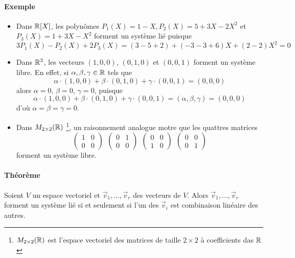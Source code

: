 \paragraph{Exemple}\begin{itemize}
	\item Dans $\mathbb{R}[X]$, les polynômes $P_1(X) = 1 - X, P_2(X) = 5 + 3 X - 2 X^2$ et $ P_3(X) = 1 + 3 X - X^2$ forment un système lié puisque 
	  $$3 P_1(X) - P_2(X) + 2 P_3(X) = (3 - 5 + 2) + (-3 - 3 + 6) X + (2 - 2) X^2 =0$$
	  
	\item Dans $\mathbb{R}^3$, les vecteurs $(1,0,0)$, $(0,1,0)$ et $(0,0,1)$ forment un système libre. En effet, si $\alpha, \beta, \gamma \in \mathbb{R}$ tels que 
	  $$\alpha \cdot (1,0,0)+ \beta \cdot (0,1,0)+ \gamma \cdot (0,0,1) = (0,0,0)$$ 
	  alors $\alpha = 0$, $\beta = 0$, $\gamma = 0$, puisque 
	  $$\alpha \cdot (1,0,0)+ \beta \cdot (0,1,0) + \gamma \cdot (0,0,1)
	    =(\alpha,\beta,\gamma)
	    =(0,0,0)$$ 
	  d'où $\alpha = \beta = \gamma = 0$.
	  
	\item Dans $M_{2 \times 2}(\mathbb{R})$ \footnote{$M_{2 \times 2}(\mathbb{R})$ est l'espace vectoriel des matrices de taille $2 \times 2$ à coefficients das $\mathbb{R}$}, un raisonnement analogue motre que les quattres matrices 
	  $$\begin{pmatrix} 1 & 0 \\ 0 & 0 \end{pmatrix} ~ ~ 
	    \begin{pmatrix} 0 & 1 \\ 0 & 0 \end{pmatrix} ~ ~
	    \begin{pmatrix} 0 & 0 \\ 1 & 0 \end{pmatrix} ~ ~
	    \begin{pmatrix} 0 & 0 \\ 0 & 1 \end{pmatrix}$$ 
	  forment un système libre.
\end{itemize}

\paragraph{Théorème} Soient $V$ un espace vectoriel et $\vec{v}_1, \ldots, \vec{v}_r$ des vecteurs de $V$. Alors $\vec{v}_1, \ldots, \vec{v}_r$ forment un système lié si et seulement si l'un des $\vec{v}_i$ est combinaison linéaire des autres.
